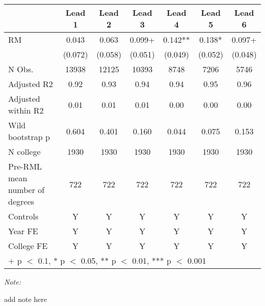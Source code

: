 \begin{table}
\centering
\begin{threeparttable}
\begin{tabular}[t]{lcccccc}
\toprule
  & Lead 1 & Lead 2 & Lead 3 & Lead 4 & Lead 5 & Lead 6\\
\midrule
RM & \num{0.043} & \num{0.063} & \num{0.099}+ & \num{0.142}** & \num{0.138}* & \num{0.097}+\\
 & (\num{0.072}) & (\num{0.058}) & (\num{0.051}) & (\num{0.049}) & (\num{0.052}) & (\num{0.048})\\
\midrule
N Obs. & \num{13938} & \num{12125} & \num{10393} & \num{8748} & \num{7206} & \num{5746}\\
Adjusted R2 & \num{0.92} & \num{0.93} & \num{0.94} & \num{0.94} & \num{0.95} & \num{0.96}\\
Adjusted within R2 & \num{0.01} & \num{0.01} & \num{0.01} & \num{0.00} & \num{0.00} & \num{0.00}\\
Wild bootstrap p & 0.604 & 0.401 & 0.160 & 0.044 & 0.075 & 0.153\\
N college & 1930 & 1930 & 1930 & 1930 & 1930 & 1930\\
Pre-RML mean number of degrees & 722 & 722 & 722 & 722 & 722 & 722\\
Controls & Y & Y & Y & Y & Y & Y\\
Year FE & Y & Y & Y & Y & Y & Y\\
College FE & Y & Y & Y & Y & Y & Y\\
\bottomrule
\multicolumn{7}{l}{\rule{0pt}{1em}+ p $<$ 0.1, * p $<$ 0.05, ** p $<$ 0.01, *** p $<$ 0.001}\\
\end{tabular}
\begin{tablenotes}
\item \textit{Note: } 
\item add note here
\end{tablenotes}
\end{threeparttable}
\end{table}
